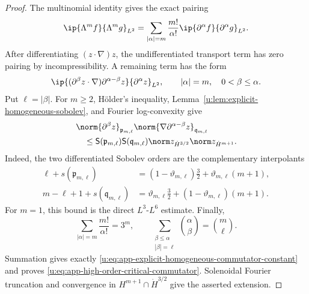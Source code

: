 \begin{proof}
The multinomial identity gives the exact pairing
\[
 \ip{\Lambda^mf}{\Lambda^mg}_{L^2}
 =
 \sum_{|\alpha|=m}\frac{m!}{\alpha!}
 \ip{\partial^\alpha f}{\partial^\alpha g}_{L^2}.
\]
After differentiating \((z\cdot\nabla)z\), the undifferentiated transport
term has zero pairing by incompressibility.  A remaining term has the form
\[
 \ip{(\partial^\beta z\cdot\nabla)
          \partial^{\alpha-\beta}z}
      {\partial^\alpha z}_{L^2},
 \qquad
 |\alpha|=m,\quad 0<\beta\le\alpha.
\]
Put \(\ell=|\beta|\).  For \(m\ge2\), H\"older's inequality,
Lemma~\ref{u:lem:explicit-homogeneous-sobolev}, and Fourier log-convexity give
\begin{align*}
 &\norm{\partial^\beta z}_{\mathfrak p_{m,\ell}}
 \norm{\nabla\partial^{\alpha-\beta}z}_{\mathfrak q_{m,\ell}}\\
 &\quad\le
 \mathsf S(\mathfrak p_{m,\ell})
 \mathsf S(\mathfrak q_{m,\ell})
 \norm z_{\dot H^{3/2}}\norm z_{\dot H^{m+1}}.
\end{align*}
Indeed, the two differentiated Sobolev orders are the complementary
interpolants
\begin{align*}
 \ell+s(\mathfrak p_{m,\ell})
 &=(1-\vartheta_{m,\ell})\frac32
   +\vartheta_{m,\ell}(m+1),\\
 m-\ell+1+s(\mathfrak q_{m,\ell})
 &=\vartheta_{m,\ell}\frac32
   +(1-\vartheta_{m,\ell})(m+1).
\end{align*}
For \(m=1\), this bound is the direct \(L^3\)-\(L^6\) estimate.
Finally,
\[
 \sum_{|\alpha|=m}\frac{m!}{\alpha!}=3^m,
 \qquad
 \sum_{\substack{\beta\le\alpha\\|\beta|=\ell}}
 \binom\alpha\beta=\binom m\ell.
\]
Summation gives exactly
\eqref{u:eq:app-explicit-homogeneous-commutator-constant} and proves
\eqref{u:eq:app-high-order-critical-commutator}.
Solenoidal Fourier truncation and convergence in
\(H^{m+1}\cap\dot H^{3/2}\) give the asserted extension.
\end{proof}

